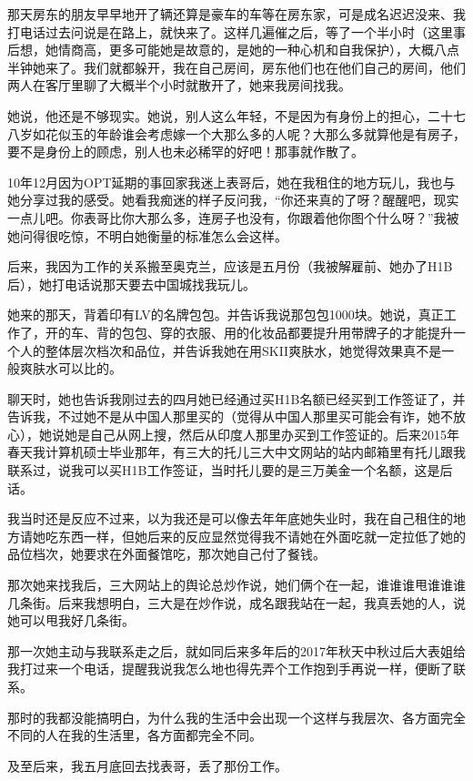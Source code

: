 \documentclass[9pt, b5paper]{article}
\begin{document}
那天房东的朋友早早地开了辆还算是豪车的车等在房东家，可是成名迟迟没来、我打电话过去问说是在路上，就快来了。这样几遍催之后，等了一个半小时（这里事后想，她情商高，更多可能她是故意的，是她的一种心机和自我保护），大概八点半钟她来了。我们就都躲开，我在自己房间，房东他们也在他们自己的房间，他们两人在客厅里聊了大概半个小时就散开了，她来我房间找我。

她说，他还是不够现实。她说，别人这么年轻，不是因为有身份上的担心，二十七八岁如花似玉的年龄谁会考虑嫁一个大那么多的人呢？大那么多就算他是有房子，要不是身份上的顾虑，别人也未必稀罕的好吧！那事就作散了。 

10年12月因为OPT延期的事回家我迷上表哥后，她在我租住的地方玩儿，我也与她分享过我的感受。她看我痴迷的样子反问我，“你还来真的了呀？醒醒吧，现实一点儿吧。你表哥比你大那么多，连房子也没有，你跟着他你图个什么呀？”我被她问得很吃惊，不明白她衡量的标准怎么会这样。 

后来，我因为工作的关系搬至奥克兰，应该是五月份（我被解雇前、她办了H1B后），她打电话说那天要去中国城找我玩儿。

她来的那天，背着印有LV的名牌包包。并告诉我说那包包1000块。她说，真正工作了，开的车、背的包包、穿的衣服、用的化妆品都要提升用带牌子的才能提升一个人的整体层次档次和品位，并告诉我她在用SKII爽肤水，她觉得效果真不是一般爽肤水可以比的。

聊天时，她也告诉我刚过去的四月她已经通过买H1B名额已经买到工作签证了，并告诉我，不过她不是从中国人那里买的（觉得从中国人那里买可能会有诈，她不放心），她说她是自己从网上搜，然后从印度人那里办买到工作签证的。后来2015年春天我计算机硕士毕业那年，有三大的托儿三大中文网站的站内邮箱里有托儿跟我联系过，说我可以买H1B工作签证，当时托儿要的是三万美金一个名额，这是后话。 

我当时还是反应不过来，以为我还是可以像去年年底她失业时，我在自己租住的地方请她吃东西一样，但她后来的反应显然觉得我不请她在外面吃就一定拉低了她的品位档次，她要求在外面餐馆吃，那次她自己付了餐钱。 

那次她来找我后，三大网站上的舆论总炒作说，她们俩个在一起，谁谁谁甩谁谁谁几条街。后来我想明白，三大是在炒作说，成名跟我站在一起，我真丢她的人，说她可以甩我好几条街。

那一次她主动与我联系走之后，就如同后来多年后的2017年秋天中秋过后大表姐给我打过来一个电话，提醒我说我怎么地也得先弄个工作抱到手再说一样，便断了联系。

那时的我都没能搞明白，为什么我的生活中会出现一个这样与我层次、各方面完全不同的人在我的生活里，各方面都完全不同。 

及至后来，我五月底回去找表哥，丢了那份工作。
\end{document}
